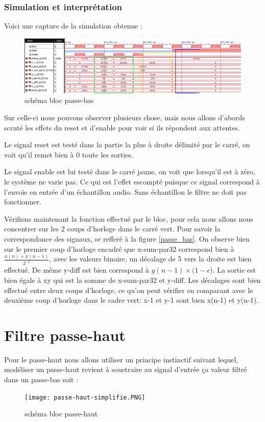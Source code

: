 \documentclass[hidelinks]{article}
\begin{document}
    \subsubsection{Simulation et interprétation}
    Voici une capture de la simulation obtenue :
    \begin{figure}[h]
    	\centering
    	\includegraphics[width=15cm, keepaspectratio=true]{simu_pb_1.PNG}
    	\caption{schéma bloc passe-bas}
	\end{figure}
	Sur celle-ci nous pouvons observer plusieurs chose, mais nous allons d'abords scruté les effets du reset et d'enable pour voir si ils répondent aux attentes.
	
	Le signal reset est testé dans la partie la plus à droite délimité par le carré, on voit qu'il remet bien à 0 toute les sorties.
    
    
    Le signal enable est lui testé dans le carré jaune, on voit que lorsqu'il est à zéro, le système ne varie pas. Ce qui est l'effet escompté puisque ce signal correspond à l'envoie en entrée d'un échantillon audio. Sans échantillon le filtre ne doit pas fonctionner.
    
    Vérifions maintenant la fonction effectué par le bloc, pour cela nous allons nous concentrer sur les 2 coups d'horloge dans le carré vert. Pour savoir la correspondance des signaux, se refferé à la figure \ref{passe_bas}.
    On observe bien sur le premier coup d'horloge encadré que x-sum-par32 correspond bien à ${\frac{x(n)+x(n-1)}{2^{-5}}}$, avec les valeurs binaire, un décalage de 5 vers la droite est bien effectué. De même y-diff est bien correspond à $y(n-1)\times(1-\epsilon$). La sortie est bien égale à xy qui est la somme de x-sum-par32 et y-diff. Les décalages sont bien effectué entre deux coups d'horloge, ce qu'on peut vérifier en comparant avec le deuxième coup d'horloge dans le cadre vert: x-1 et y-1 sont bien x(n-1) et y(n-1).
	
    \section{Filtre passe-haut}
    Pour le passe-haut nous allons utiliser un principe instinctif suivant lequel, modéliser un passe-haut revient à soustraire au signal d'entrée ça valeur filtré dans un passe-bas soit :
    \begin{figure}[h]
    	\centering
    	\texttt{[image: passe-haut-simplifie.PNG]}
    	\caption{schéma bloc passe-haut}
    \end{figure}
\end{document}

